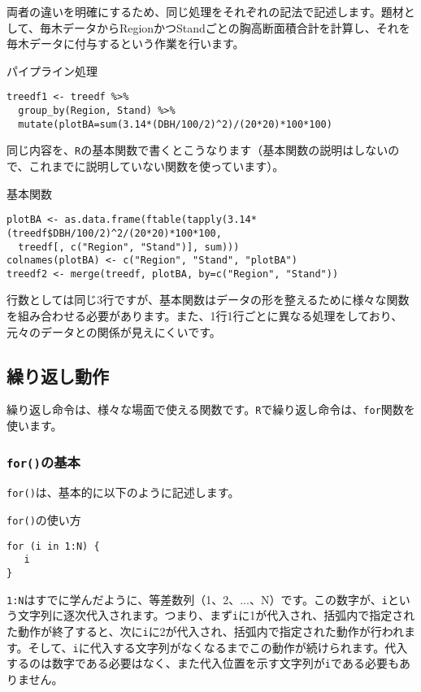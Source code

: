両者の違いを明確にするため、同じ処理をそれぞれの記法で記述します。題材として、毎木データからRegionかつStandごとの胸高断面積合計を計算し、それを毎木データに付与するという作業を行います。
\begin{itembox}[l]{パイプライン処理}
\begin{verbatim}
treedf1 <- treedf %>%
  group_by(Region, Stand) %>%
  mutate(plotBA=sum(3.14*(DBH/100/2)^2)/(20*20)*100*100)
\end{verbatim}
\end{itembox}

同じ内容を、\texttt{R}の基本関数で書くとこうなります（基本関数の説明はしないので、これまでに説明していない関数を使っています）。
\begin{itembox}[l]{基本関数}
\begin{verbatim}
plotBA <- as.data.frame(ftable(tapply(3.14*(treedf$DBH/100/2)^2/(20*20)*100*100,
  treedf[, c("Region", "Stand")], sum)))
colnames(plotBA) <- c("Region", "Stand", "plotBA")
treedf2 <- merge(treedf, plotBA, by=c("Region", "Stand"))
\end{verbatim}
\end{itembox}

行数としては同じ3行ですが、基本関数はデータの形を整えるために様々な関数を組み合わせる必要があります。また、1行1行ごとに異なる処理をしており、元々のデータとの関係が見えにくいです。

  \subsection{繰り返し動作}
繰り返し命令は、様々な場面で使える関数です。\texttt{R}で繰り返し命令は、\verb|for|関数を使います。
	\subsubsection{\texttt{for()}の基本}
\verb|for()|は、基本的に以下のように記述します。
\begin{itembox}[l]{\texttt{for()}の使い方}
\begin{verbatim}
for (i in 1:N) {
   i
}
\end{verbatim}
\end{itembox}

\verb|1:N|はすでに学んだように、等差数列（1、2、...、N）です。この数字が、\verb|i|という文字列に逐次代入されます。つまり、まず\verb|i|に1が代入され、括弧内で指定された動作が終了すると、次に\verb|i|に2が代入され、括弧内で指定された動作が行われます。そして、\verb|i|に代入する文字列がなくなるまでこの動作が続けられます。代入するのは数字である必要はなく、また代入位置を示す文字列が\verb|i|である必要もありません。


